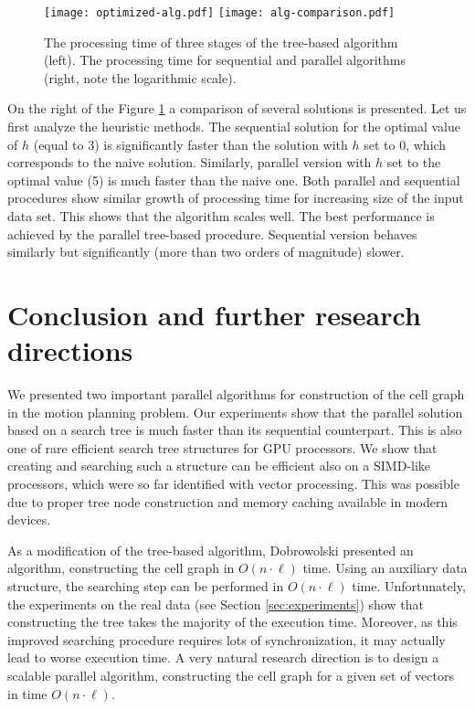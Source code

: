 \documentclass[a4paper]{article}
\begin{document}
\begin{figure}[h]
\texttt{[image: optimized-alg.pdf]}
\texttt{[image: alg-comparison.pdf]}
\caption{\label{fig:results} The processing time of three stages of the tree-based algorithm (left). The processing time for sequential and parallel algorithms (right, note the logarithmic scale).}
\end{figure}

On the right of the Figure \ref{fig:results} a comparison of several solutions is presented. 
Let us first analyze the heuristic methods. The sequential solution for the optimal value of $h$ (equal to 3) is significantly faster than the solution with $h$ set to 0, which corresponds to the naive solution. 
Similarly, parallel version with $h$ set to the optimal value (5) is much faster than the naive one. Both parallel and sequential procedures show similar growth of processing time for increasing size of the input data set. This shows that the algorithm scales well.
The best performance is achieved by the parallel tree-based procedure. Sequential version behaves similarly but significantly (more than two orders of magnitude) slower. 

\section{Conclusion and further research directions} \label{sec:future}

We presented two important parallel algorithms for construction of the cell graph in the motion planning problem. Our experiments show that the parallel solution based on a search tree is much faster than its sequential counterpart. This is also one of rare efficient search tree structures for GPU processors. We show that creating and searching such a structure can be efficient also on a SIMD-like processors, which were so far identified with vector processing. This was possible due to proper tree node construction and memory caching available in modern devices.

As a modification of the tree-based algorithm, Dobrowolski presented an algorithm, constructing the cell graph in $O(n \cdot \ell)$ time. Using an auxiliary data structure, the searching step can be performed in $O(n \cdot \ell)$ time.
Unfortunately, the experiments on the real data (see Section \ref{sec:experiments}) show that constructing the tree takes the majority of the execution time. Moreover, as this improved searching procedure requires lots of synchronization, it may actually lead to worse execution time.
A very natural research direction is to design a scalable parallel algorithm, constructing the cell graph for a given set of vectors in time $O(n \cdot \ell)$.
\end{document}
